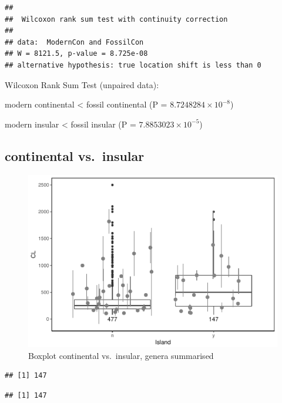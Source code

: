 \documentclass[]{article}
\begin{document}
\begin{verbatim}
## 
##  Wilcoxon rank sum test with continuity correction
## 
## data:  ModernCon and FossilCon
## W = 8121.5, p-value = 8.725e-08
## alternative hypothesis: true location shift is less than 0
\end{verbatim}

Wilcoxon Rank Sum Test (unpaired data):

modern continental \textless{} fossil continental (P =
\(8.7248284\times 10^{-8}\))

modern insular \textless{} fossil insular (P =
\(7.8853023\times 10^{-5}\))

\newpage

\subsection{continental vs.~insular}\label{continental-vs.insular-1}

\begin{figure}[htbp]
\centering
\includegraphics{MA_JJ_files/figure-latex/BPCI-1.pdf}
\caption{Boxplot continental vs.~insular, genera summarised}
\end{figure}

\begin{verbatim}
## [1] 147
\end{verbatim}

\begin{verbatim}
## [1] 147
\end{verbatim}
\end{document}
